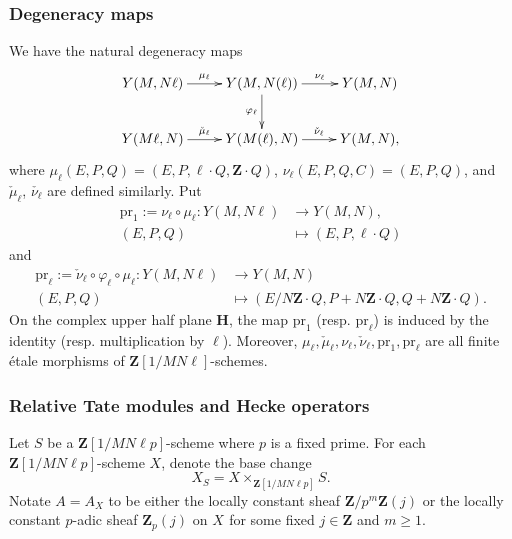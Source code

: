 \documentclass[10pt,letterpaper]{amsart}
\theoremstyle{plain}
\theoremstyle{definition}
\theoremstyle{definition}
\theoremstyle{plain}
\theoremstyle{plain}
\theoremstyle{plain}
\theoremstyle{remark}
\numberwithin{equation}{section}
\DeclareMathOperator{\et}{\acute{e}t}
\newcommand{\Z}{\mathbf{Z}}
\begin{document}
\subsubsection{Degeneracy maps}
We have the natural degeneracy maps
\[
\xymatrix{
    Y(M,N\ell)  \ar[r]^-{\mu_\ell} & Y(M,N(\ell)) \ar[d]_-{\varphi_\ell} \ar[r]^-{\nu_\ell} & Y(M,N)  \\
   Y(M\ell,N) \ar[r]^-{\check{\mu}_\ell} & Y(M(\ell),N) \ar[r]^-{\check{\nu}_\ell} & Y(M,N),  
}
\]
where $\mu_\ell(E,P,Q)=(E,P,\ell\cdot Q,\Z\cdot Q)$, $\nu_\ell(E,P,Q,C)=(E,P,Q)$, and $\check{\mu}_\ell$, $\check{\nu_\ell}$ are defined similarly. Put
\begin{equation}
\begin{split}
\text{pr}_1:=\nu_\ell\circ \mu_\ell: 
Y(M,N\ell)&\rightarrow Y(M,N),    \\
(E,P,Q)&\mapsto (E,P,\ell\cdot Q)
\end{split}\nonumber
\end{equation}
and
\begin{align*}
\text{pr}_\ell:=\check{\nu}_\ell\circ\varphi_\ell\circ \mu_\ell:
Y(M,N\ell)&\rightarrow Y(M,N)   \\
       (E,P,Q)&\mapsto (E/N\Z\cdot Q ,P+N\Z\cdot Q, Q+N\Z\cdot Q). 
  \end{align*}
On the complex upper half plane $\mathbf{H}$, the map $\text{pr}_1$ (resp.   $\text{pr}_\ell$) is induced by the identity (resp. multiplication by $\ell$). Moreover,  $\mu_\ell,\check{\mu}_\ell,\nu_\ell,\check{\nu}_\ell,\text{pr}_1,\text{pr}_\ell$ are all finite \'etale morphisms of $\Z[1/MN\ell]$-schemes.



\subsubsection{Relative Tate modules and Hecke operators}\label{relativeTate}

Let $S$ be a $\Z[1/MN\ell p]$-scheme where $p$ is a fixed prime. For each $\Z[1/MN\ell p]$-scheme $X$, denote the base change \[X_S=X\times_{\Z[1/MN\ell p]}S.\] Notate $A=A_X$ to be either the locally constant sheaf $\Z/p^m\Z(j)$ or the locally constant $p$-adic sheaf $\Z_p(j)$ on $X_{\et}$ %
for some fixed  $j\in \Z$ and $m\geq 1$. 
\end{document}
